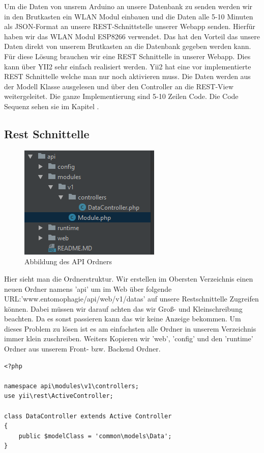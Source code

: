 Um die Daten von unsrem Arduino an unsere Datenbank zu senden werden wir in den Brutkasten ein WLAN Modul einbauen und die Daten alle 5-10 Minuten als JSON-Format an unsere REST-Schnittstelle unserer Webapp senden. Hierfür haben wir das WLAN Modul ESP8266 verwendet. Das hat den Vorteil das unsere Daten direkt von unserem Brutkasten an die Datenbank gegeben werden kann.
\newline
Für diese Lösung brauchen wir eine REST Schnittelle in unserer Webapp. Dies kann über YII2 sehr einfach realisiert werden. Yii2 hat eine vor implementierte REST Schnittelle welche man nur noch aktivieren muss. Die Daten werden aus der Modell Klasse ausgelesen und über den Controller an die REST-View weitergeleitet. Die ganze Implementierung sind 5-10 Zeilen Code. Die Code Sequenz sehen sie im Kapitel .

\subsection{Rest Schnittelle} \label{sec:Rest}
\begin{figure}	
\includegraphics{figures/Ordner}
\caption{Abbildung des API Ordners}
\end{figure}
\newline
Hier sieht man die Ordnerstruktur. Wir erstellen im Obersten Verzeichnis einen neuen Ordner namens 'api' um im Web über folgende \newline URL:'www.entomophagie/api/web/v1/datas' auf unsere Restschnittelle Zugreifen können. Dabei müssen wir darauf achten das wir Groß- und Kleinschreibung beachten. Da es sonst passieren kann das wir keine Anzeige bekommen. Um dieses Problem zu lösen ist es am einfachsten alle Ordner in unserem Verzeichnis immer klein zuschreiben.\newline
Weiters Kopieren wir 'web', 'config' und den 'runtime' Ordner aus unserem Front- bzw. Backend Ordner. 
\begin{lstlisting}[caption=Controller Klasse für REST]
<?php

namespace api\modules\v1\controllers;
use yii\rest\ActiveController;

class DataController extends Active Controller
{
	public $modelClass = 'common\models\Data';
}
\end{lstlisting}

